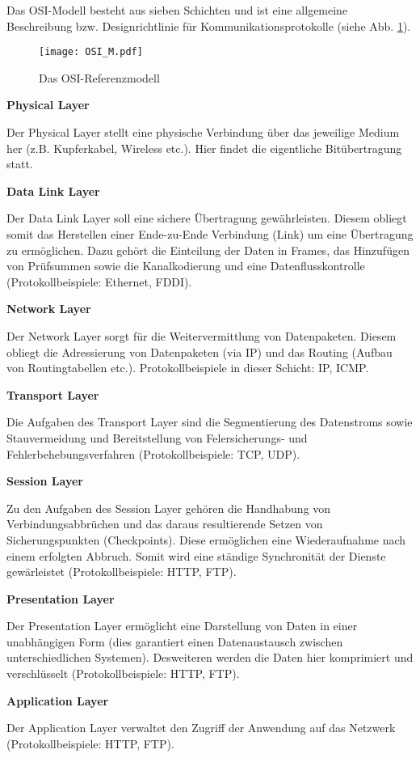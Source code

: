 Das OSI-Modell besteht aus sieben Schichten und ist eine allgemeine Beschreibung
bzw. Designrichtlinie f{\"u}r Kommunikationsprotokolle (siehe Abb.
\ref{fig:OSI_M}).

\begin{figure}[H]
\centering
\texttt{[image: OSI\_M.pdf]}
\caption{Das OSI-Referenzmodell}
\label{fig:OSI_M}
\end{figure}

\textbf{Physical Layer}

Der Physical Layer stellt eine physische Verbindung {\"u}ber das jeweilige
Medium her (z.B. Kupferkabel, Wireless etc.). Hier findet die eigentliche
Bit{\"u}bertragung statt.

\textbf{Data Link Layer}

Der Data Link Layer soll eine sichere {\"U}bertragung gew{\"a}hrleisten. Diesem
obliegt somit das Herstellen einer Ende-zu-Ende Verbindung (Link) um eine
{\"U}bertragung zu erm{\"o}glichen. Dazu geh{\"o}rt die Einteilung der Daten in
Frames, das Hinzuf{\"u}gen von Pr{\"u}fsummen sowie die Kanalkodierung und eine
Datenflusskontrolle (Protokollbeispiele: Ethernet, FDDI).

\textbf{Network Layer}

Der Network Layer sorgt f{\"u}r die Weitervermittlung von Datenpaketen. Diesem
obliegt die Adressierung von Datenpaketen (via \gls{IP}) und das Routing (Aufbau
von Routingtabellen etc.). Protokollbeispiele in dieser Schicht: \gls{IP}, ICMP.

\textbf{Transport Layer}

Die Aufgaben des Transport Layer sind die Segmentierung des Datenstroms sowie
Stauvermeidung und Bereitstellung von Felersicherungs- und
Fehlerbehebungsverfahren (Protokollbeispiele: \gls{TCP}, \gls{UDP}).

\textbf{Session Layer}

Zu den Aufgaben des Session Layer geh{\"o}ren die Handhabung von
Verbindungsabbr{\"u}chen und das daraus resultierende Setzen von
Sicherungspunkten (Checkpoints). Diese erm{\"o}glichen eine Wiederaufnahme
nach einem erfolgten Abbruch. Somit wird eine st{\"a}ndige Synchronit{\"a}t der
Dienste gew{\"a}rleistet (Protokollbeispiele: HTTP, FTP).

\textbf{Presentation Layer}

Der Presentation Layer erm{\"o}glicht eine Darstellung von Daten in
einer unabh{\"a}ngigen Form (dies garantiert einen Datenaustausch zwischen
unterschiedlichen Systemen). Desweiteren werden die Daten hier komprimiert und
verschl{\"u}sselt (Protokollbeispiele: HTTP, FTP).

\textbf{Application Layer}

Der Application Layer verwaltet den Zugriff der Anwendung auf das Netzwerk
(Protokollbeispiele: HTTP, FTP).
